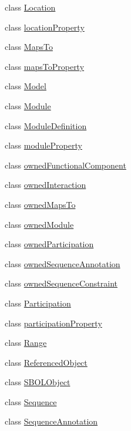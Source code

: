 \begin{DoxyCompactItemize}
class \hyperlink{classsbol_1_1libsbol_1_1_location}{Location}
\item 
class \hyperlink{classsbol_1_1libsbol_1_1location_property}{location\+Property}
\item 
class \hyperlink{classsbol_1_1libsbol_1_1_maps_to}{Maps\+To}
\item 
class \hyperlink{classsbol_1_1libsbol_1_1maps_to_property}{maps\+To\+Property}
\item 
class \hyperlink{classsbol_1_1libsbol_1_1_model}{Model}
\item 
class \hyperlink{classsbol_1_1libsbol_1_1_module}{Module}
\item 
class \hyperlink{classsbol_1_1libsbol_1_1_module_definition}{Module\+Definition}
\item 
class \hyperlink{classsbol_1_1libsbol_1_1module_property}{module\+Property}
\item 
class \hyperlink{classsbol_1_1libsbol_1_1owned_functional_component}{owned\+Functional\+Component}
\item 
class \hyperlink{classsbol_1_1libsbol_1_1owned_interaction}{owned\+Interaction}
\item 
class \hyperlink{classsbol_1_1libsbol_1_1owned_maps_to}{owned\+Maps\+To}
\item 
class \hyperlink{classsbol_1_1libsbol_1_1owned_module}{owned\+Module}
\item 
class \hyperlink{classsbol_1_1libsbol_1_1owned_participation}{owned\+Participation}
\item 
class \hyperlink{classsbol_1_1libsbol_1_1owned_sequence_annotation}{owned\+Sequence\+Annotation}
\item 
class \hyperlink{classsbol_1_1libsbol_1_1owned_sequence_constraint}{owned\+Sequence\+Constraint}
\item 
class \hyperlink{classsbol_1_1libsbol_1_1_participation}{Participation}
\item 
class \hyperlink{classsbol_1_1libsbol_1_1participation_property}{participation\+Property}
\item 
class \hyperlink{classsbol_1_1libsbol_1_1_range}{Range}
\item 
class \hyperlink{classsbol_1_1libsbol_1_1_referenced_object}{Referenced\+Object}
\item 
class \hyperlink{classsbol_1_1libsbol_1_1_s_b_o_l_object}{S\+B\+O\+L\+Object}
\item 
class \hyperlink{classsbol_1_1libsbol_1_1_sequence}{Sequence}
\item 
class \hyperlink{classsbol_1_1libsbol_1_1_sequence_annotation}{Sequence\+Annotation}

\end{DoxyCompactItemize}

